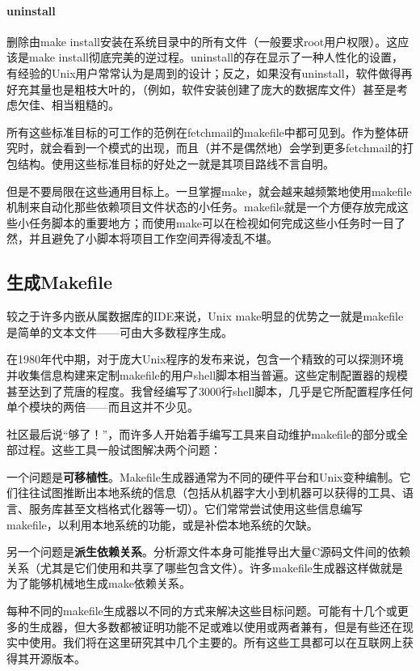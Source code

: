 \documentclass[12pt,oneside]{book}
\begin{document}
\begin{common-format}
\paragraph{uninstall}
删除由make install安装在系统目录中的所有文件（一般要求root用户权限）。这应该是make install彻底完美的逆过程。uninstall的存在显示了一种人性化的设置，有经验的Unix用户常常认为是周到的设计；反之，如果没有uninstall，软件做得再好充其量也是粗枝大叶的，（例如，软件安装创建了庞大的数据库文件）甚至是考虑欠佳、相当粗糙的。

所有这些标准目标的可工作的范例在fetchmail的makefile中都可见到。作为整体研究时，就会看到一个模式的出现，而且（并不是偶然地）会学到更多fetchmail的打包结构。使用这些标准目标的好处之一就是其项目路线不言自明。

但是不要局限在这些通用目标上。一旦掌握make，就会越来越频繁地使用makefile机制来自动化那些依赖项目文件状态的小任务。makefile就是一个方便存放完成这些小任务脚本的重要地方；而使用make可以在检视如何完成这些小任务时一目了然，并且避免了小脚本将项目工作空间弄得凌乱不堪。


\subsection{生成Makefile}
较之于许多内嵌从属数据库的IDE来说，Unix make明显的优势之一就是makefile是简单的文本文件——可由大多数程序生成。

在1980年代中期，对于庞大Unix程序的发布来说，包含一个精致的可以探测环境并收集信息构建来定制makefile的用户shell脚本相当普遍。这些定制配置器的规模甚至达到了荒唐的程度。我曾经编写了3000行shell脚本，几乎是它所配置程序任何单个模块的两倍——而且这并不少见。

社区最后说“够了！”，而许多人开始着手编写工具来自动维护makefile的部分或全部过程。这些工具一般试图解决两个问题：

一个问题是\textbf{可移植性}。Makefile生成器通常为不同的硬件平台和Unix变种编制。它们往往试图推断出本地系统的信息（包括从机器字大小到机器可以获得的工具、语言、服务库甚至文档格式化器等一切）。它们常常尝试使用这些信息编写makefile，以利用本地系统的功能，或是补偿本地系统的欠缺。

另一个问题是\textbf{派生依赖关系}。分析源文件本身可能推导出大量C源码文件间的依赖关系（尤其是它们使用和共享了哪些包含文件）。许多makefile生成器这样做就是为了能够机械地生成make依赖关系。

每种不同的makefile生成器以不同的方式来解决这些目标问题。可能有十几个或更多的生成器，但大多数都被证明功能不足或难以使用或两者兼有，但是有些还在现实中使用。我们将在这里研究其中几个主要的。所有这些工具都可以在互联网上获得其开源版本。


\end{common-format}
\end{document}
